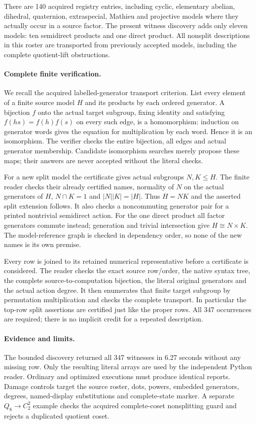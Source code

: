 \documentclass[11pt]{article}
\begin{document}
There are 140 acquired registry entries, including cyclic, elementary
abelian, dihedral, quaternion, extraspecial, Mathieu and projective models
where they actually occur in a source factor. The present witness discovery
adds only eleven models: ten semidirect products and one direct product.
All nonsplit descriptions in this roster are transported from previously
accepted models, including the complete quotient-lift obstructions.
\newpage
\paragraph{Complete finite verification.}
We recall the acquired labelled-generator transport criterion. List every
element of a finite source model $H$ and its products by each ordered
generator. A bijection $f$ onto the actual target subgroup, fixing identity
and satisfying $f(hs)=f(h)f(s)$ on every such edge, is a homomorphism:
induction on generator words gives the equation for multiplication by each
word. Hence it is an isomorphism. The verifier checks the entire bijection,
all edges and actual generator membership. Candidate isomorphism searches
merely propose these maps; their answers are never accepted without the
literal checks.

For a new split model the certificate gives actual subgroups $N,K\leq H$.
The finite reader checks their already certified names, normality of $N$ on
the actual generators of $H$, $N\cap K=1$ and $|N||K|=|H|$. Thus $H=NK$
and the asserted split extension follows. It also checks a noncommuting
generator pair for a printed nontrivial semidirect action. For the one
direct product all factor generators commute instead; generation and
trivial intersection give $H\cong N\times K$. The model-reference graph is
checked in dependency order, so none of the new names is its own premise.

Every row is joined to its retained numerical representative before a
certificate is considered. The reader checks the exact source row/order,
the native syntax tree, the complete source-to-computation bijection,
the literal original generators and the actual action degree. It then
enumerates that finite target subgroup by permutation multiplication and
checks the complete transport. In particular the top-row split assertions
are certified just like the proper rows. All 347 occurrences are required;
there is no implicit credit for a repeated description.

\paragraph{Evidence and limits.}
The bounded discovery returned all 347 witnesses in 6.27 seconds without
any missing row. Only the resulting literal arrays are used by the
independent Python reader. Ordinary and optimized executions must produce
identical reports. Damage controls target the source roster, dots, powers,
embedded generators, degrees, named-display substitutions and complete-state
marker. A separate $Q_8\to C_2^2$ example checks the acquired complete-coset
nonsplitting guard and rejects a duplicated quotient coset.
\end{document}
